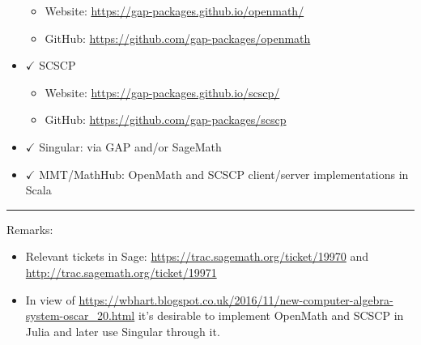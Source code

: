 \begin{itemize}
  \begin{itemize}
  \tightlist
  \item
    Website: \url{https://gap-packages.github.io/openmath/}
  \item
    GitHub: \url{https://github.com/gap-packages/openmath}
  \end{itemize}
\item
  \(\checkmark\) SCSCP

  \begin{itemize}
  \tightlist
  \item
    Website: \url{https://gap-packages.github.io/scscp/}
  \item
    GitHub: \url{https://github.com/gap-packages/scscp}
  \end{itemize}
\item
  \(\checkmark\) Singular: via GAP and/or SageMath
\item
  \(\checkmark\) MMT/MathHub: OpenMath and SCSCP client/server
  implementations in Scala
\end{itemize}

\begin{center}\rule{0.5\linewidth}{\linethickness}\end{center}

Remarks:

\begin{itemize}
\tightlist
\item
  Relevant tickets in Sage: \url{https://trac.sagemath.org/ticket/19970}
  and \url{http://trac.sagemath.org/ticket/19971}
\item
  In view of
  \url{https://wbhart.blogspot.co.uk/2016/11/new-computer-algebra-system-oscar_20.html}
  it's desirable to implement OpenMath and SCSCP in Julia and later use
  Singular through it.
\end{itemize}
